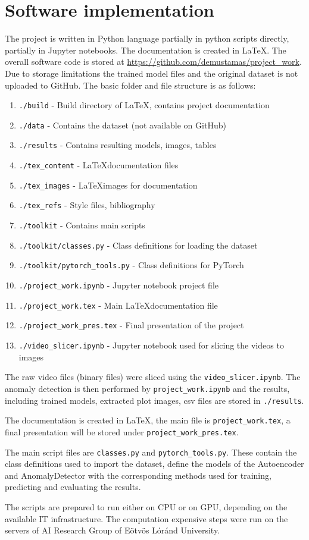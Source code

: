 \section{Software implementation} \label{sw_code}
The project is written in Python language partially in python scripts directly,
partially in Jupyter notebooks.
The documentation is created in \LaTeX.
The overall software code is stored at \url{https://github.com/demustamas/project_work}.
Due to storage limitations the trained model files and the original dataset is not uploaded to GitHub.
The basic folder and file structure is as follows:

\begin{enumerate}
    \item \lstinline{./build} - Build directory of \LaTeX, contains project documentation
    \item \lstinline{./data} - Contains the dataset (not available on GitHub)
    \item \lstinline{./results} - Contains resulting models, images, tables
    \item \lstinline{./tex_content} - \LaTeX documentation files
    \item \lstinline{./tex_images} - \LaTeX images for documentation
    \item \lstinline{./tex_refs} - Style files, bibliography
    \item \lstinline{./toolkit} - Contains main scripts
    \item \lstinline{./toolkit/classes.py} - Class definitions for loading the dataset
    \item \lstinline{./toolkit/pytorch_tools.py} - Class definitions for PyTorch
    \item \lstinline{./project_work.ipynb} - Jupyter notebook project file
    \item \lstinline{./project_work.tex} - Main \LaTeX documentation file
    \item \lstinline{./project_work_pres.tex} - Final presentation of the project
    \item \lstinline{./video_slicer.ipynb} - Jupyter notebook used for slicing the videos to images
\end{enumerate}

The raw video files (binary files) were sliced using the \lstinline{video_slicer.ipynb}.
The anomaly detection is then performed by \lstinline{project_work.ipynb} and the results,
including trained models, extracted plot images, csv files are stored in \lstinline{./results}.

The documentation is created in \LaTeX, the main file is \lstinline{project_work.tex},
a final presentation will be stored under \lstinline{project_work_pres.tex}.

The main script files are \lstinline{classes.py} and \lstinline{pytorch_tools.py}.
These contain the class definitions used to import the dataset, define the models
of the Autoencoder and AnomalyDetector with the corresponding methods used for training,
predicting and evaluating the results.

The scripts are prepared to run either on CPU or on GPU, depending on the available IT infrastructure.
The computation expensive steps were run on the servers of AI Research Group of Eötvös Lóránd University.